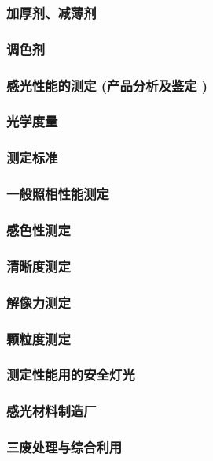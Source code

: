 \documentclass[UTF8]{../../ApplicationUniverse}
\begin{document}
        \subsubsection{加厚剂、减薄剂}
        \subsubsection{调色剂}
    \subsubsection{感光性能的测定 (产品分析及鉴定 )}
        \subsubsection{光学度量}
        \subsubsection{测定标准}
        \subsubsection{一般照相性能测定}
        \subsubsection{感色性测定}
        \subsubsection{清晰度测定}
        \subsubsection{解像力测定}
        \subsubsection{颗粒度测定}
        \subsubsection{测定性能用的安全灯光}
\subsubsection{感光材料制造厂}
\subsubsection{三废处理与综合利用}
\end{document}

